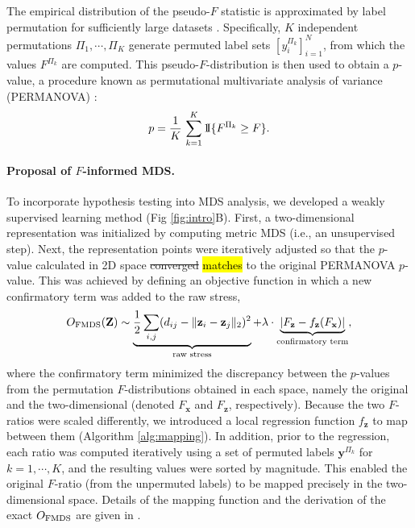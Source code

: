 \documentclass[10pt,letterpaper]{article}
\newcommand{\1}{{\rm 1}\kern-0.24em{\rm I}}
\providecommand{\DIFdeltex}[1]{{\protect\color{red}\sout{#1}}}                      %
\providecommand{\DIFaddbegin}{} %
\providecommand{\DIFaddend}{} %
\providecommand{\DIFdelbegin}{} %
\providecommand{\DIFdelend}{} %
\providecommand{\DIFdel}[1]{\texorpdfstring{\DIFdeltex{#1}}{}} %
\newcommand{\DIFscaledelfig}{0.5}
\newlength{\DIFdelgraphicswidth} %
\newlength{\DIFdelgraphicsheight} %
\newcommand{\DIFaddincludegraphics}[2][]{{\color{blue}\fbox{\DIFOincludegraphics[#1]{#2}}}} %
\newcommand{\DIFdelincludegraphics}[2][]{%
\sbox{\DIFdelgraphicsbox}{\DIFOincludegraphics[#1]{#2}}%
\settoboxwidth{\DIFdelgraphicswidth}{\DIFdelgraphicsbox} %
\settoboxtotalheight{\DIFdelgraphicsheight}{\DIFdelgraphicsbox} %
\scalebox{\DIFscaledelfig}{%
\parbox[b]{\DIFdelgraphicswidth}{\usebox{\DIFdelgraphicsbox}\\[-\baselineskip] \rule{\DIFdelgraphicswidth}{0em}}\llap{\resizebox{\DIFdelgraphicswidth}{\DIFdelgraphicsheight}{%
\setlength{\unitlength}{\DIFdelgraphicswidth}%
\begin{picture}(1,1)%
\thicklines\linethickness{2pt} %
{\color[rgb]{1,0,0}\put(0,0){\framebox(1,1){}}}%
{\color[rgb]{1,0,0}\put(0,0){\line( 1,1){1}}}%
{\color[rgb]{1,0,0}\put(0,1){\line(1,-1){1}}}%
\end{picture}%
}\hspace*{3pt}}} %
} %
\DeclareRobustCommand{\DIFaddbegin}{\DIFOaddbegin \let\includegraphics\DIFaddincludegraphics} %
\DeclareRobustCommand{\DIFaddend}{\DIFOaddend \let\includegraphics\DIFOincludegraphics} %
\DeclareRobustCommand{\DIFdelbegin}{\DIFOdelbegin \let\includegraphics\DIFdelincludegraphics} %
\DeclareRobustCommand{\DIFdelend}{\DIFOaddend \let\includegraphics\DIFOincludegraphics} %
\begin{document}
The empirical distribution of the pseudo-$F$ statistic is approximated by label permutation for sufficiently large datasets \cite{holmes96, gijbels13}.
Specifically, $K$ independent permutations $\Pi_1 , \cdots ,\Pi_K$ generate permuted label sets $[y_i^{\Pi_k}]_{i=1}^{N}$, from which the values $F^{\Pi_k}$ are computed. This pseudo-$F$-distribution is then used to obtain a $p$-value, a procedure known as permutational multivariate analysis of variance (PERMANOVA) \cite{anderson01}:
\begin{equation}
p = \frac{1}{K}\,\sum_{k=1}^{K}\1\{F^{\Pi_k}\geq F\}.
\end{equation}

\paragraph*{Proposal of $F$-informed MDS.}
To incorporate hypothesis testing into MDS analysis, we developed a weakly supervised learning method (Fig \ref{fig:intro}B).
First, a two-dimensional representation was initialized by computing metric MDS (i.e., an unsupervised step).
Next, the representation points were iteratively adjusted so that the $p$-value calculated in 2D space \DIFdelbegin \DIFdel{converged }\DIFdelend \DIFaddbegin \hl{matches} \DIFaddend to the original PERMANOVA $p$-value.
This was achieved by defining an objective function in which a new confirmatory term was added to the raw stress,
\begin{equation} \label{eq:fmds}
    O_{\rm FMDS}(\mathbf{Z}) \sim
    \underbrace{\frac{1}{2}\sum_{i,j} (d_{ij} - \| \mathbf{z}_i - \mathbf{z}_j \|_2 )^2}_\text{raw stress} +
    \lambda\cdot \underbrace{\left|F_\mathbf{z} - f_\mathbf{z}(F_\mathbf{x})\right|}_\text{confirmatory term},
\end{equation}
where the confirmatory term minimized the discrepancy between the $p$-values from the permutation $F$-distributions obtained in each space, namely the original and the two-dimensional (denoted $F_\mathbf{x}$ and $F_\mathbf{z}$, respectively).
Because the two $F$-ratios were scaled differently, we introduced a local regression function $f_\mathbf{z}$ to map between them (Algorithm \ref{alg:mapping}). In addition, prior to the regression, each ratio was computed iteratively using a set of permuted labels $\mathbf{y}^{\Pi_k}$ for $k=1, \cdots, K$, and the resulting values were sorted by magnitude. This enabled the original $F$-ratio (from the unpermuted labels) to be mapped precisely in the two-dimensional space.
Details of the mapping function and the derivation of the exact $O_{\rm FMDS}$ are given in .
\end{document}
